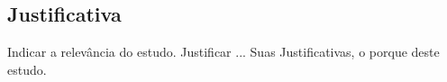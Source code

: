 \subsection{Justificativa }
Indicar a relevância do estudo.
Justificar ...
Suas Justificativas, o porque deste estudo.